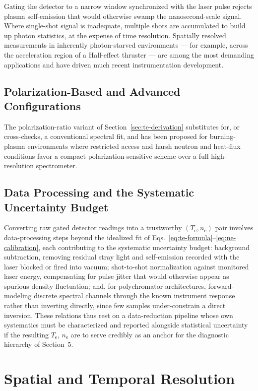 Gating the detector to a narrow window synchronized with the laser pulse rejects plasma self-emission that would otherwise swamp the nanosecond-scale signal. Where single-shot signal is inadequate, multiple shots are accumulated to build up photon statistics, at the expense of time resolution. Spatially resolved measurements in inherently photon-starved environments — for example, across the acceleration region of a Hall-effect thruster \cite{ref0356} — are among the most demanding applications and have driven much recent instrumentation development.

\subsection{Polarization-Based and Advanced Configurations}

The polarization-ratio variant of Section~\ref{sec:te-derivation} substitutes for, or cross-checks, a conventional spectral fit, and has been proposed for burning-plasma environments where restricted access and harsh neutron and heat-flux conditions favor a compact polarization-sensitive scheme over a full high-resolution spectrometer.

\subsection{Data Processing and the Systematic Uncertainty Budget}

Converting raw gated detector readings into a trustworthy $(T_{\mathrm{e}}, n_{\mathrm{e}})$ pair involves data-processing steps beyond the idealized fit of Eqs.~\eqref{eq:te-formula}--\eqref{eq:ne-calibration}, each contributing to the systematic uncertainty budget: background subtraction, removing residual stray light and self-emission recorded with the laser blocked or fired into vacuum; shot-to-shot normalization against monitored laser energy, compensating for pulse jitter that would otherwise appear as spurious density fluctuation; and, for polychromator architectures, forward-modeling discrete spectral channels through the known instrument response rather than inverting directly, since few samples under-constrain a direct inversion. These relations thus rest on a data-reduction pipeline whose own systematics must be characterized and reported alongside statistical uncertainty if the resulting $T_{\mathrm{e}}$, $n_{\mathrm{e}}$ are to serve credibly as an anchor for the diagnostic hierarchy of Section~5.

\section{Spatial and Temporal Resolution}


